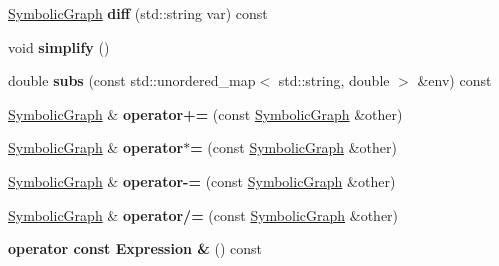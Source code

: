\begin{DoxyCompactItemize}
\item 
\hyperlink{classSymbolicGraph}{Symbolic\+Graph} {\bfseries diff} (std\+::string var) const \hypertarget{classSymbolicGraph_a71c7e9f02a6f2506314ce8b8dccd78df}{}\label{classSymbolicGraph_a71c7e9f02a6f2506314ce8b8dccd78df}

\item 
void {\bfseries simplify} ()\hypertarget{classSymbolicGraph_a2b12feeeb679a6799e114e99a91c9e80}{}\label{classSymbolicGraph_a2b12feeeb679a6799e114e99a91c9e80}

\item 
double {\bfseries subs} (const std\+::unordered\+\_\+map$<$ std\+::string, double $>$ \&env) const \hypertarget{classSymbolicGraph_a470b39c87fb803a18918d8e8ada371e3}{}\label{classSymbolicGraph_a470b39c87fb803a18918d8e8ada371e3}

\item 
\hyperlink{classSymbolicGraph}{Symbolic\+Graph} \& {\bfseries operator+=} (const \hyperlink{classSymbolicGraph}{Symbolic\+Graph} \&other)\hypertarget{classSymbolicGraph_abd6cd0d404566b2b643327ea454384fb}{}\label{classSymbolicGraph_abd6cd0d404566b2b643327ea454384fb}

\item 
\hyperlink{classSymbolicGraph}{Symbolic\+Graph} \& {\bfseries operator$\ast$=} (const \hyperlink{classSymbolicGraph}{Symbolic\+Graph} \&other)\hypertarget{classSymbolicGraph_aad5aba18069da2ec192e50a5f4661c2a}{}\label{classSymbolicGraph_aad5aba18069da2ec192e50a5f4661c2a}

\item 
\hyperlink{classSymbolicGraph}{Symbolic\+Graph} \& {\bfseries operator-\/=} (const \hyperlink{classSymbolicGraph}{Symbolic\+Graph} \&other)\hypertarget{classSymbolicGraph_ac720f558ee919c39df18c5f9c5291bc0}{}\label{classSymbolicGraph_ac720f558ee919c39df18c5f9c5291bc0}

\item 
\hyperlink{classSymbolicGraph}{Symbolic\+Graph} \& {\bfseries operator/=} (const \hyperlink{classSymbolicGraph}{Symbolic\+Graph} \&other)\hypertarget{classSymbolicGraph_adde5ac44b8b9cae4a985252b99c5ccf9}{}\label{classSymbolicGraph_adde5ac44b8b9cae4a985252b99c5ccf9}

\item 
{\bfseries operator const Expression \&} () const \hypertarget{classSymbolicGraph_ada1476495cfffcb55dbf2de82f75ebb3}{}\label{classSymbolicGraph_ada1476495cfffcb55dbf2de82f75ebb3}

\end{DoxyCompactItemize}
